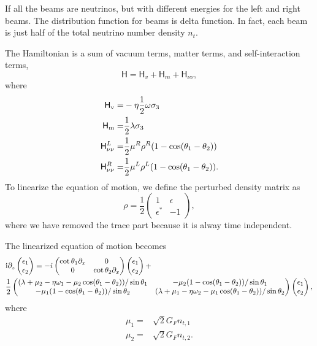 If all the beams are neutrinos, but with different energies for the left and right beams. The distribution function for beams is delta function. In fact, each beam is just half of the total neutrino number density $n_t$.

The Hamiltonian is a sum of vacuum terms, matter terms, and self-interaction terms,
\begin{equation}
   \mathsf H= \mathsf H_v + \mathsf H_m + \mathsf H_{\nu\nu},
\end{equation}
where
\begin{align}
   \mathsf H_\mathrm v =& - \eta \frac{1}{2}\omega \sigma_3 \\
   \mathsf H_\mathrm m =& \frac{1}{2}\lambda \sigma_3\\
   \mathsf H_{\nu\nu}^L =& \frac{1}{2}\mu^R \rho^R (1-\cos(\theta_1-\theta_2))\\
   \mathsf H_{\nu\nu}^R =& \frac{1}{2}\mu^L \rho^L (1-\cos(\theta_1-\theta_2)).
\end{align}
To linearize the equation of motion, we define the perturbed density matrix as
\begin{equation}
   \rho = \frac{1}{2}\begin{pmatrix}
   1 & \epsilon\\
   \epsilon^* & -1
   \end{pmatrix},
\end{equation}
where we have removed the trace part because it is alway time independent.


The linearized equation of motion becomes
\small\begin{align}
   &\ri \partial_z \begin{pmatrix}
   \epsilon_1 \\
   \epsilon_2
   \end{pmatrix} =  - i \begin{pmatrix}\cot\theta_1\partial_x & 0 \\
   0 & \cot\theta_2 \partial_x
   \end{pmatrix} \begin{pmatrix}
   \epsilon_1 \\
   \epsilon_2
   \end{pmatrix} + \nonumber\\
   &
   \frac{1}{2}\begin{pmatrix}
   (\lambda+ \mu_2 - \eta \omega_1 - \mu_2 \cos(\theta_1-\theta_2) )/\sin \theta_1 & -\mu_2 (1-\cos(\theta_1-\theta_2)) /\sin \theta_1\\
   -\mu_1 (1- \cos(\theta_1-\theta_2))/\sin\theta_2 & (\lambda + \mu_1 - \eta \omega_2 - \mu_1 \cos(\theta_1-\theta_2) )/\sin\theta_2
   \end{pmatrix}\begin{pmatrix}
   \epsilon_1 \\
   \epsilon_2
   \end{pmatrix},
   \label{chap:collective-sec:two-beams-eqn:line-model-two-beams-all-neutrino-linearized-eom}
\end{align}\normalsize
where
\begin{align*}
   \mu_1 =& \sqrt{2}G_F n_{t,1}\\
   \mu_2 =& \sqrt{2}G_F n_{t,2}.
\end{align*}



